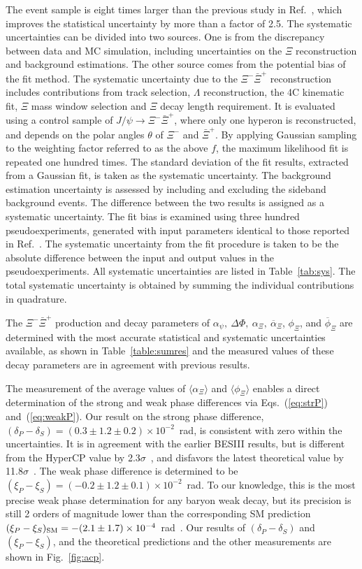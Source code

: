 \documentclass[aps,amsmath,amssymb,reprint]{revtex4-2}
\newcommand{\xip}{\bar{\Xi}^{+}}
\newcommand{\XXb}{\Xi^{-}\bar{\Xi}^{+}}
\newcommand{\jpsi}{J/\psi}
\begin{document}
The event sample is eight times larger than the previous study in Ref.~\cite{BESIII:2021ypr}, which improves the statistical uncertainty by more than a factor of 2.5.
The systematic uncertainties can be divided into two sources. One is from the discrepancy between data and MC simulation, including uncertainties on the $\Xi$ reconstruction and background estimations. The other source comes from the potential bias of the fit method.
The systematic uncertainty due to the $\XXb$ reconstruction includes contributions from track selection, $\Lambda$ reconstruction, the 4C kinematic fit, $\Xi$ mass window selection and $\Xi$ decay length requirement. It is evaluated using a control sample of $\jpsi\to\XXb$, where only one hyperon is reconstructed, and depends on the polar angles $\theta$ of $\Xi^-$ and $\xip$. By applying Gaussian sampling to the weighting factor referred to as the above $f$, the maximum likelihood fit is repeated one hundred times. The standard deviation of the fit results, extracted from a Gaussian fit, is taken as the systematic uncertainty.
The background estimation uncertainty is assessed by including and excluding the sideband background events. The difference between the two results is assigned as a systematic uncertainty.
The fit bias is examined using three hundred pseudoexperiments, generated with input parameters identical to those reported in Ref.~\cite{BESIII:2021ypr}.
The systematic uncertainty from the fit procedure is taken to be the absolute difference between the input and output values in the pseudoexperiments.
All systematic uncertainties are listed in Table~\ref{tab:sys}. The total systematic uncertainty is obtained by summing the individual contributions in quadrature.





The $\XXb$ production and decay parameters of $\alpha_\psi,\ \Delta\Phi,\ \alpha_\Xi,\ \overline\alpha_\Xi$, $\phi_\Xi$, and $\overline\phi_\Xi$ are determined with the most accurate statistical and systematic uncertainties available, as shown in Table~\ref{table:sumres} and the measured values of these decay parameters are in agreement with previous results.

The measurement of the average values of $\langle\alpha_\Xi\rangle$ and $\langle\phi_\Xi\rangle$ enables a direct determination of the strong and weak phase differences via Eqs.~(\ref{eq:strP}) and~(\ref{eq:weakP}). Our result on the strong phase difference, $(\delta_P - \delta_S) = (0.3\pm1.2\pm0.2)\times10^{-2}$~rad, is consistent with zero within the uncertainties. It is in agreement with the earlier BESIII results, but is different from the HyperCP value by 2.3$\sigma$~\cite{HyperCP:2004zvh}, and disfavors the latest theoretical value by 11.8$\sigma$~\cite{Huang:2017bmx}.
The weak phase difference is determined to be $(\xi_P-\xi_S)=(-0.2\pm1.2\pm0.1)\times10^{-2}$~rad. To our knowledge, this is the most precise weak phase determination for any baryon weak decay, but its precision is still 2 orders of magnitude lower than the corresponding SM prediction $(\xi_P-\xi_S)_{\rm SM}=-(2.1\pm1.7)\times10^{-4}$~rad~\cite{Salone:2022lpt}.
Our results of $(\delta_P-\delta_S)$ and $(\xi_P-\xi_S)$, and the theoretical predictions and the other measurements are shown in Fig.~\ref{fig:acp}.
\end{document}
